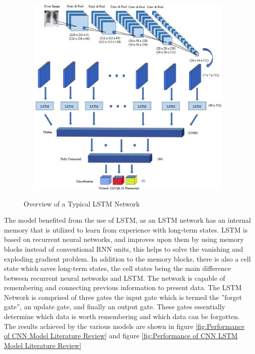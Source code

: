 \vspace{0.5mm}
 \begin{figure}[H]
    \centering
    \includegraphics[width=1\textwidth,height=10cm,keepaspectratio]{Images/lstmDiagram.png}\\
    \caption{Overview of a Typical LSTM Network\cite{litReviewCnnLstm}}
    \label{fig:Diagram of Long Short Term Memory Network}
\end{figure}
\vspace{0.5mm}
The model benefited from the use of LSTM, as an LSTM network has an internal memory that is utilized to learn from experience with long-term states. LSTM is based on recurrent neural networks, and improves upon them by using memory blocks instead of conventional RNN units, this helps to solve the vanishing and exploding gradient problem\cite{vanishingExplodingGradients}.  In addition to the memory blocks, there is also a cell state which saves long-term states, the cell states being the main difference between recurrent neural networks and LSTM.  The network is capable of remembering and connecting previous information to present data\cite{lstmRemembering}.  The LSTM Network is comprised of three gates the input gate which is termed the ''forget gate'', an update gate, and finally an output gate.  These gates essentially determine which data is worth remembering and which data can be forgotten.
\\
The results achieved by the various models are shown in figure \ref{fig:Performance of CNN Model Literature Review} and figure \ref{fig:Performance of CNN LSTM Model Literature Review}

